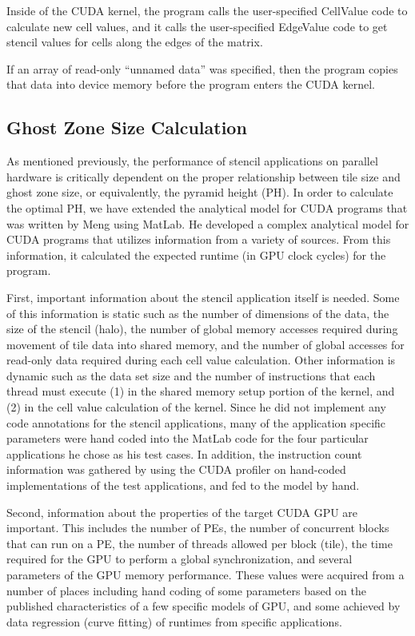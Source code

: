 \documentclass{styles/sig-alternate}
\begin{document}
Inside of the CUDA kernel, the program calls the user-specified
CellValue code to calculate new cell values, and it calls the
user-specified EdgeValue code to get stencil values for cells along
the edges of the matrix.

If an array of read-only ``unnamed data'' was specified, then the
program copies that data into device memory before the program enters
the CUDA kernel.

\subsection{Ghost Zone Size Calculation}

As mentioned previously, the performance of stencil applications on parallel hardware 
is critically dependent on the proper relationship between tile size and ghost zone size,
or equivalently, the pyramid height (PH).
In order to calculate the optimal PH,
we have extended the analytical model for CUDA programs that was written by Meng using MatLab.  
He developed a complex analytical model for CUDA programs that utilizes information from a variety of sources.
From this information, it calculated the expected runtime (in GPU clock cycles) for the program.

First, important information about the stencil application itself is needed.  Some of this information is 
static such as the number of dimensions of the data, the size of the stencil (halo), 
the number of global memory accesses required during movement of tile data into shared memory, 
and the number of global accesses for read-only 
data required during each cell value calculation.  Other information is dynamic such as the data set size
and the number of instructions that each thread must execute
(1) in the shared memory setup portion of the kernel, and (2) in the cell value calculation of the kernel.  
Since he did not implement any code annotations for the stencil applications, 
many of the application specific parameters were hand coded into the MatLab code for the four particular 
applications he chose as his test cases.  In addition, the instruction count information was gathered 
by using the CUDA profiler on hand-coded implementations of the test applications, and fed to the model by hand.

Second, information about the properties of the target CUDA GPU are important.  
This includes the number of PEs, 
the number of concurrent blocks that can run on a PE, the number of threads allowed per block (tile), 
the time required for the GPU to perform a global synchronization, 
and several parameters of the GPU memory performance.  
These values were acquired from a number of places including hand coding of some parameters 
based on the published characteristics of a few specific models of GPU, 
and some achieved by data regression (curve fitting) of runtimes from specific applications.
\end{document}
